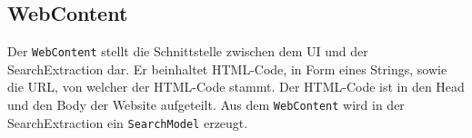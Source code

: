 \subsection{WebContent}

Der \lstinline|WebContent| stellt die Schnittstelle zwischen dem UI und der SearchExtraction dar. Er beinhaltet HTML-Code, in Form eines Strings, sowie die URL, von welcher der HTML-Code stammt. Der HTML-Code ist in den Head und den Body der Website aufgeteilt.\newline
Aus dem \lstinline|WebContent| wird in der SearchExtraction ein \lstinline|SearchModel| erzeugt.

